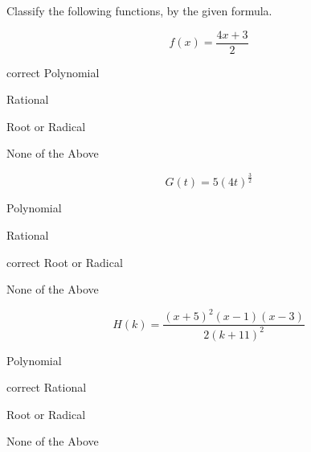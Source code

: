 \documentclass{ximera}
\author{Lee Wayand}
\begin{document}
\begin{exercise}




Classify the following functions, by the given formula.



\begin{question}


\[
f(x) = \frac{4x + 3}{2}
\]

\begin{multipleChoice}
\item [correct]{Polynomial}
\item {Rational}
\item {Root or Radical}
\item {None of the Above}
\end{multipleChoice}


\end{question}











\begin{question}


\[
G(t) = 5 (4t)^{\tfrac{3}{2}}
\]

\begin{multipleChoice}
\item {Polynomial}
\item {Rational}
\item [correct]{Root or Radical}
\item {None of the Above}
\end{multipleChoice}


\end{question}







\begin{question}


\[
H(k) = \frac{(x+5)^2 (x-1) (x-3)}{2(k + 11)^2}
\]

\begin{multipleChoice}
\item {Polynomial}
\item [correct]{Rational}
\item {Root or Radical}
\item {None of the Above}
\end{multipleChoice}



\end{question}
\end{exercise}
\end{document}
